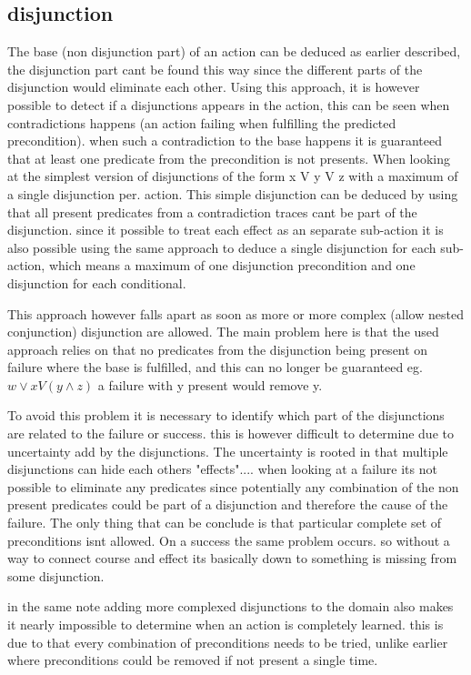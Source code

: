 \subsection{disjunction}
	The base (non disjunction part) of an action can be deduced as earlier described, the disjunction part cant be found this way since the different parts of the disjunction would eliminate each other. Using this approach, it is however possible to detect if a disjunctions appears in the action, this can be seen when contradictions happens (an action failing when fulfilling the predicted precondition). when such a contradiction to the base happens it is guaranteed that at least one predicate from the precondition is not presents. When looking at the simplest version of disjunctions of the form  x V y V z with a maximum of a single disjunction per. action. This simple disjunction can be deduced by using that all present predicates from a contradiction traces cant be part of the disjunction. since it possible to treat each effect as an separate sub-action it is also possible using the same approach to deduce a single disjunction for each sub-action, which means a maximum of one disjunction precondition and one disjunction for each conditional. 
	
	This approach however falls apart as soon as more or more complex (allow nested conjunction) disjunction are allowed. The main problem here is that the used approach relies on that no predicates from the disjunction being present on failure where the base is fulfilled, and this can no longer be guaranteed eg. $w \lor x V (y \land z )$ a failure with y present would remove y. 
	
	To avoid this problem it is necessary to identify which part of the disjunctions are related to the failure or success. this is however difficult to determine due to uncertainty add by the disjunctions. 
	The uncertainty is rooted in that multiple disjunctions can hide each others "effects".... 
	when looking at a failure its not possible to eliminate any predicates 
	since potentially any combination of the non present predicates could be part of a disjunction and therefore the cause of the failure. The only thing that can be conclude is that particular complete set of preconditions isnt allowed. On a success the same problem occurs. so without a way to connect course and effect its basically down to something is missing from some disjunction.
	
	in the same note adding more complexed disjunctions to the domain also makes it nearly impossible to determine when an action is completely learned. this is due to that every combination of preconditions needs to be tried, unlike earlier where preconditions could be removed if not present a single time.
	
